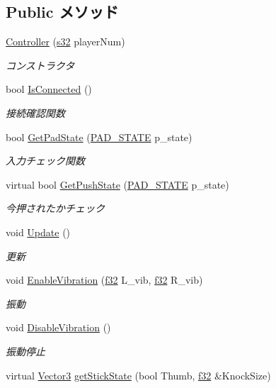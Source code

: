 \subsection*{Public メソッド}
\begin{DoxyCompactItemize}
\item 
\hyperlink{class_controller_ac9d03e1da9368429d3f0d6eb95b1a8b8}{Controller} (\hyperlink{_main_8h_a0ce6887c26c1c49ad3be5710dd42bfd6}{s32} player\-Num)
\begin{DoxyCompactList}\small\item\em コンストラクタ \end{DoxyCompactList}\item 
bool \hyperlink{class_controller_aaf45107d378df1c4fe8a4063064474d6}{Is\-Connected} ()
\begin{DoxyCompactList}\small\item\em 接続確認関数 \end{DoxyCompactList}\item 
bool \hyperlink{class_controller_af2947dbd362fb0932f88cefe13fb5ac1}{Get\-Pad\-State} (\hyperlink{class_controller_a5bae253bd639d029d58ea618fafc5299}{P\-A\-D\-\_\-\-S\-T\-A\-T\-E} p\-\_\-state)
\begin{DoxyCompactList}\small\item\em 入力チェック関数 \end{DoxyCompactList}\item 
virtual bool \hyperlink{class_controller_a6ae2692ddfad643a5d185fe59ff1210c}{Get\-Push\-State} (\hyperlink{class_controller_a5bae253bd639d029d58ea618fafc5299}{P\-A\-D\-\_\-\-S\-T\-A\-T\-E} p\-\_\-state)
\begin{DoxyCompactList}\small\item\em 今押されたかチェック \end{DoxyCompactList}\item 
void \hyperlink{class_controller_a6f23f649f5dc2255706f2f151bf30690}{Update} ()
\begin{DoxyCompactList}\small\item\em 更新 \end{DoxyCompactList}\item 
void \hyperlink{class_controller_ac248b3473dda30d886c94f91aaaa794b}{Enable\-Vibration} (\hyperlink{_main_8h_a5f6906312a689f27d70e9d086649d3fd}{f32} L\-\_\-vib, \hyperlink{_main_8h_a5f6906312a689f27d70e9d086649d3fd}{f32} R\-\_\-vib)
\begin{DoxyCompactList}\small\item\em 振動 \end{DoxyCompactList}\item 
void \hyperlink{class_controller_ac62ee454c173e7881e789f5d5c0a356e}{Disable\-Vibration} ()
\begin{DoxyCompactList}\small\item\em 振動停止 \end{DoxyCompactList}\item 
virtual \hyperlink{struct_vector3}{Vector3} \hyperlink{class_controller_ab6334185106b21110b4a9d47a2ad659e}{get\-Stick\-State} (bool Thumb, \hyperlink{_main_8h_a5f6906312a689f27d70e9d086649d3fd}{f32} \&Knock\-Size)
\end{DoxyCompactItemize}
